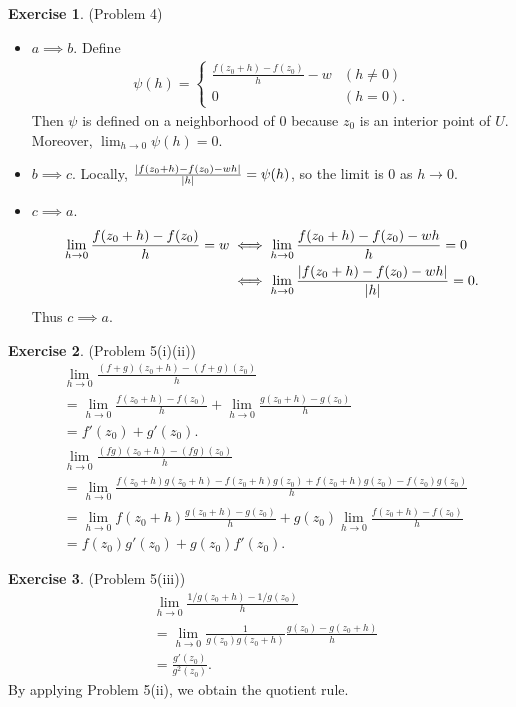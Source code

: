 \documentclass[12pt, psamsfonts]{amsart}
\theoremstyle{definition}
\newtheorem*{exer}{Exercise}
\theoremstyle{remark}
\numberwithin{equation}{section}
\begin{document}
\begin{exer}{(Problem 4)}
  \begin{itemize}
    \item
      $a \implies b$.
      Define
      \begin{align*}
       \psi(h) = \begin{cases}
         \frac{f(z_0 + h) - f(z_0)}{h} - w & (h \ne 0) \\
         0 & (h = 0).
       \end{cases}
      \end{align*}
      Then $\psi$ is defined on a neighborhood of $0$ because $z_0$ is an interior point of $U$.
      Moreover, $\lim_{h \rightarrow 0} \psi(h) = 0$.
    \item
      $b \implies c$.
      Locally, $\frac{\abs{f(z_0 + h) - f(z_0) - wh}}{{\abs{h}}} = \psi(h)$, so the limit is 0 as $h \rightarrow 0$.
    \item
      $c \implies a$.
      \begin{align*}
        \lim_{h \rightarrow 0} \frac{f(z_0 + h) - f(z_0)}{h} = w
          &\iff \lim_{h \rightarrow 0} \frac{f(z_0 + h) - f(z_0) - wh}{h} = 0 \\
          &\iff \lim_{h \rightarrow 0} \frac{\abs{f(z_0 + h) - f(z_0) - wh}}{\abs{h}} = 0.
      \end{align*}
      Thus $c \implies a$.
  \end{itemize}
\end{exer}

\begin{exer}{(Problem 5(i)(ii))}
  \begin{align*}
    &\lim_{h \rightarrow 0} \frac{(f + g)(z_0 + h) - (f + g)(z_0)}{h} \\
      &= \lim_{h \rightarrow 0} \frac{f(z_0 + h) - f(z_0)}{h} + \lim_{h \rightarrow 0} \frac{g(z_0 + h) - g(z_0)}{h} \\
      &= f'(z_0) + g'(z_0). \\
    &\lim_{h \rightarrow 0} \frac{(fg)(z_0 + h) - (fg)(z_0)}{h} \\
      &= \lim_{h \rightarrow 0} \frac{f(z_0 + h)g(z_0 + h) - f(z_0 + h)g(z_0) + f(z_0 + h)g(z_0) - f(z_0)g(z_0)}{h} \\
      &= \lim_{h \rightarrow 0} f(z_0 + h)\frac{g(z_0 + h) - g(z_0)}{h} + g(z_0)\lim_{h \rightarrow 0}\frac{f(z_0 + h) - f(z_0)}{h} \\
      &= f(z_0)g'(z_0) + g(z_0)f'(z_0).
  \end{align*}
\end{exer}

\begin{exer}{(Problem 5(iii))}
  \begin{align*}
    &\lim_{h \rightarrow 0} \frac{1/g(z_0 + h) - 1 / g(z_0)}{h} \\
      &= \lim_{h \rightarrow 0} \frac{1}{g(z_0)g(z_0+h)} \frac{g(z_0) - g(z_0 + h)}{h} \\
      &= \frac{g'(z_0)}{g^2(z_0)}.
  \end{align*}
  By applying Problem 5(ii), we obtain the quotient rule.
\end{exer}
\end{document}

